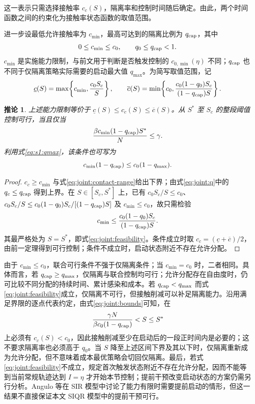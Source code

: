 \documentclass[lang=cn,a4paper,newtx]{elegantpaper}
\numberwithin{equation}{section}
\theoremstyle{plain}
\newtheorem{corollaryn}[theorem]{推论}
\begin{document}
这一表示只需选择接触率 $c_c(S)$，隔离率和控制时间随后确定。由此，两个时间函数之间的约束化为接触率状态函数的取值范围。

进一步设最低允许接触率为 $c_{\min}$，最高可达到的隔离比例为 $q_{\rm cap}$，其中
\[
0\le c_{\min}\le c_0,\qquad q_0\le q_{\rm cap}<1.
\]
$c_{\min}$ 是实施能力限制，与前文用于判断是否触发控制的 $c_{0,\min}(\eta)$ 不同；$q_{\rm cap}$ 也不同于仅隔离策略实际需要的启动最大值 $q_{\max}$。为简写取值范围，记
\begin{equation}
\underline c(S)=\max\!\left\{c_{\min},\frac{c_0S_c}{S}\right\},\qquad
\overline c(S)=\min\!\left\{c_0,
\frac{c_0(1-q_0)S_c}{(1-q_{\rm cap})S}\right\}.
\label{eq:joint:bounds}
\end{equation}
\begin{corollaryn}
\label{cor:joint:feasibility}
上述能力限制等价于 $\underline c(S)\le c_c(S)\le\overline c(S)$。从 $S^*$ 至 $S_c$ 的整段阈值控制可行，当且仅当
\begin{equation}
\frac{\beta c_{\min}(1-q_{\rm cap})S^*}{N}\le\gamma.
\label{eq:joint:feasibility}
\end{equation}
利用式\eqref{eq:s1:qmax}，该条件也可写为
\[
c_{\min}(1-q_{\rm cap})\le c_0(1-q_{\max}).
\]
\end{corollaryn}
\begin{proof}
$c_c\ge c_{\min}$ 与式\eqref{eq:joint:contact-range}给出下界；由式\eqref{eq:joint:q}中的 $q_c\le q_{\rm cap}$ 得到上界。在 $S\in[S_c,S^*]$ 上，已有 $c_0S_c/S\le c_0$、$c_0S_c/S\le c_0(1-q_0)S_c/[(1-q_{\rm cap})S]$ 及 $c_{\min}\le c_0$，故只需检验
\[
c_{\min}\le\frac{c_0(1-q_0)S_c}{(1-q_{\rm cap})S}.
\]
其最严格处为 $S=S^*$，即式\eqref{eq:joint:feasibility}。条件成立时取 $c_c=(\underline c+\overline c)/2$，由前一定理得到可行控制；条件不成立时，启动状态附近不存在允许分配。
\end{proof}
由于 $c_{\min}\le c_0$，联合可行条件不强于仅隔离条件；当 $c_{\min}=c_0$ 时，二者相同。具体而言，若 $q_{\rm cap}\ge q_{\max}$，仅隔离与联合控制均可行；允许分配存在自由度时，仍可比较不同分配的持续时间、累计感染和成本。若 $q_{\rm cap}<q_{\max}$ 而式\eqref{eq:joint:feasibility}成立，仅隔离不可行，但接触削减可以补足隔离能力。沿用满足界限的逐点代表约定，由式\eqref{eq:joint:bounds}可知，在
\[
\frac{\gamma N}{\beta c_0(1-q_{\rm cap})}<S\le S^*
\]
上必须有 $c_c(S)<c_0$，因此接触削减至少在启动后的一段正时间内是必要的；这不要求隔离率也必须高于 $q_0$。当 $S$ 降至上述区间下界及其以下时，仅隔离重新成为允许分配，但不意味着成本最优策略会切回仅隔离。最后，若式\eqref{eq:joint:feasibility}不成立，规定首次触发状态附近不存在允许分配，因而不能等到当前常规轨迹达到 $I=\eta$ 才开始本节控制；提前干预改变启动状态的方案仍需另行分析。Angulo 等\cite{Angulo2021}在 SIR 模型中讨论了能力有限时需要提前启动的情形，但这一结果不直接保证本文 SIQR 模型中的提前干预可行。
\end{document}
